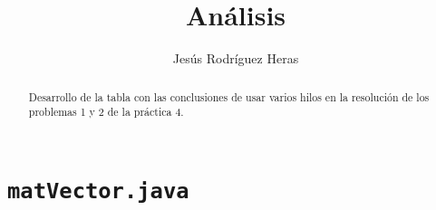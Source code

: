 \documentclass[12pt,letterpaper]{article}
\title{Análisis}
\author{Jesús Rodríguez Heras}
\begin{document}
	
	\maketitle
	\begin{abstract} %
		\begin{center}
			Desarrollo de la tabla con las conclusiones de usar varios hilos en la resolución de los problemas 1 y 2 de la práctica 4.
		\end{center}
	\end{abstract}
	\thispagestyle{empty}
	\newpage
	
	\tableofcontents
	\newpage
	
	
	
	
	\lstset{language=bash, numbers=left, numberstyle=\tiny, numbersep=10pt, firstnumber=1, stepnumber=1, basicstyle=\small\ttfamily, tabsize=1, extendedchars=true, inputencoding=latin1}

\section{\texttt{matVector.java}}
\end{document}
